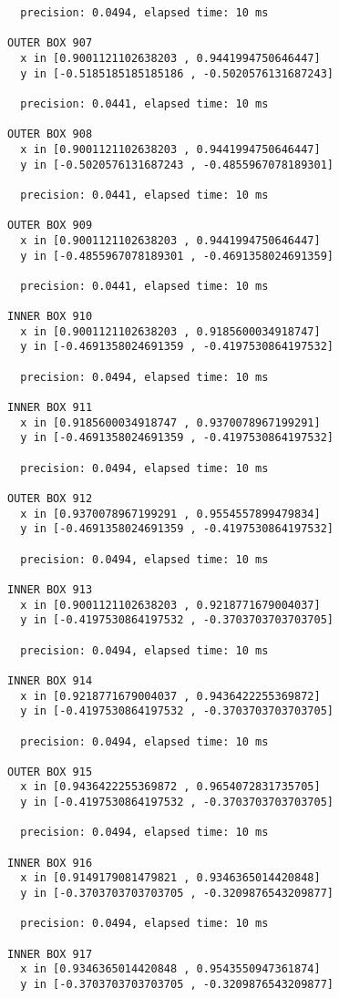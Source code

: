 \begin{verbatim}
  precision: 0.0494, elapsed time: 10 ms

OUTER BOX 907
  x in [0.9001121102638203 , 0.9441994750646447]
  y in [-0.5185185185185186 , -0.5020576131687243]

  precision: 0.0441, elapsed time: 10 ms

OUTER BOX 908
  x in [0.9001121102638203 , 0.9441994750646447]
  y in [-0.5020576131687243 , -0.4855967078189301]

  precision: 0.0441, elapsed time: 10 ms

OUTER BOX 909
  x in [0.9001121102638203 , 0.9441994750646447]
  y in [-0.4855967078189301 , -0.4691358024691359]

  precision: 0.0441, elapsed time: 10 ms

INNER BOX 910
  x in [0.9001121102638203 , 0.9185600034918747]
  y in [-0.4691358024691359 , -0.4197530864197532]

  precision: 0.0494, elapsed time: 10 ms

INNER BOX 911
  x in [0.9185600034918747 , 0.9370078967199291]
  y in [-0.4691358024691359 , -0.4197530864197532]

  precision: 0.0494, elapsed time: 10 ms

OUTER BOX 912
  x in [0.9370078967199291 , 0.9554557899479834]
  y in [-0.4691358024691359 , -0.4197530864197532]

  precision: 0.0494, elapsed time: 10 ms

INNER BOX 913
  x in [0.9001121102638203 , 0.9218771679004037]
  y in [-0.4197530864197532 , -0.3703703703703705]

  precision: 0.0494, elapsed time: 10 ms

INNER BOX 914
  x in [0.9218771679004037 , 0.9436422255369872]
  y in [-0.4197530864197532 , -0.3703703703703705]

  precision: 0.0494, elapsed time: 10 ms

OUTER BOX 915
  x in [0.9436422255369872 , 0.9654072831735705]
  y in [-0.4197530864197532 , -0.3703703703703705]

  precision: 0.0494, elapsed time: 10 ms

INNER BOX 916
  x in [0.9149179081479821 , 0.9346365014420848]
  y in [-0.3703703703703705 , -0.3209876543209877]

  precision: 0.0494, elapsed time: 10 ms

INNER BOX 917
  x in [0.9346365014420848 , 0.9543550947361874]
  y in [-0.3703703703703705 , -0.3209876543209877]


\end{verbatim}
